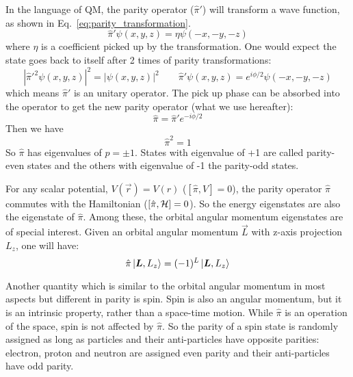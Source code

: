 In the language of QM, the parity operator ($\hat{\pi}'$) will transform 
a wave function, as shown in Eq.~\ref{eq:parity_transformation}.
\begin{equation}
    \hat{\pi}'\psi(x, y, z) = \eta \psi(-x, -y, -z)
    \label{eq:parity_transformation}
\end{equation}
where $\eta$ is a coefficient picked up by the transformation. One would expect
the state goes back to itself after 2 times of parity transformations:
\begin{equation}
    |\hat{\pi}'^2 \psi(x, y, z)|^2 = |\psi(x, y, z)|^2
    \qquad
    \hat{\pi}'\psi(x, y, z) = e^{i\phi/2}\psi(-x, -y, -z)
\end{equation}
which means $\hat{\pi}'$ is an unitary operator. The pick up phase can
be absorbed into the operator to get the new parity operator (what we use hereafter): 
\begin{equation}
    \hat{\pi} = \hat{\pi}'e^{-i\phi/2}
\end{equation}
Then we have
\begin{equation}
    \hat{\pi}^2 = 1 
\end{equation}
So $\hat{\pi}$ has eigenvalues of $p = \pm 1$. States with eigenvalue of +1 are called
parity-even states and the others with eigenvalue of -1 the parity-odd states.

For any scalar potential, $V(\vec{r}) = V(r)$ ($[\hat{\pi}, V] = 0$), the parity 
operator $\hat{\pi}$ commutes with the Hamiltonian ($[\hat{\pi}, \mathcal{H}] = 0$). 
So the energy eigenstates are also the eigenstate
of $\hat{\pi}$. Among these, the orbital angular momentum eigenstates are
of special interest. Given an orbital angular momentum $\vec{L}$ with z-axis projection
$L_z$, one will have:
\begin{equation}
    \hat{\pi}\ket{\boldsymbol{L}, L_z} = (-1)^L\ket{\boldsymbol{L}, L_z}
\end{equation}

Another quantity which is similar to the orbital angular momentum in most aspects but
different in parity is spin. Spin is also an angular momentum, but it is an 
intrinsic property, rather than a space-time motion. While $\hat{\pi}$ is an operation
of the space, spin is not affected by $\hat{\pi}$. So the parity of a spin state
is randomly assigned as long as particles and their anti-particles have opposite
parities: electron, proton and neutron are assigned even parity and
their anti-particles have odd parity.

